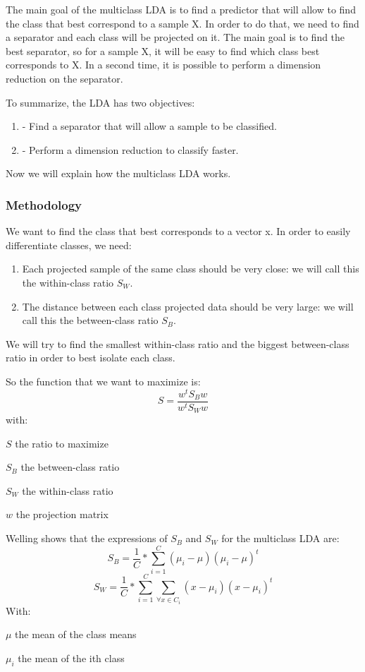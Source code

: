 The main goal of the multiclass LDA is to find a predictor that will
allow to find the class that best correspond to a sample X.  In order
to do that, we need to find a separator and each class will be
projected on it.  The main goal is to find the best separator, so for
a sample X, it will be easy to find which class best corresponds to X.
In a second time, it is possible to perform a dimension reduction on
the separator.

To summarize, the LDA has two objectives:

\begin{enumerate}
\item - Find a separator that will allow a sample to be classified.
\item - Perform a dimension reduction to classify faster.
\end{enumerate}

Now we will explain how the multiclass LDA works.

\subsubsection{Methodology}

We want to find the class that best corresponds to a vector x.
In order to easily differentiate classes, we need:

\begin{enumerate}
\item Each projected sample of the same class should be very close: we will call this the within-class ratio $S_W$.
\item The distance between each class projected data should be very large: we will call this the between-class ratio $S_B$.
\end{enumerate}

We will try to find the smallest within-class ratio and the biggest between-class ratio in order to best isolate each class.

So the function that we want to maximize is:
$$S = \frac{w^t S_B w}{w^t S_W w}$$
with:
\begin{itemize*}
  \item $S$ the ratio to maximize
  \item $S_B$ the between-class ratio
  \item $S_W$ the within-class ratio
  \item $w$ the projection matrix
\end{itemize*}

Welling\cite{welling} shows that the expressions of $S_B$ and $S_W$ for the multiclass LDA are:
$$S_B = \frac{1}{C} * \sum\limits_{i = 1}^C (\mu_i - \mu)(\mu_i - \mu)^t$$
$$S_W = \frac{1}{C} * \sum\limits_{i = 1}^C \sum\limits_{\forall x \in C_i} (x - \mu_i)(x - \mu_i)^t$$
With:
\begin{itemize*}
  \item $\mu$ the mean of the class means
  \item $\mu_i$ the mean of the ith class
\end{itemize*}


